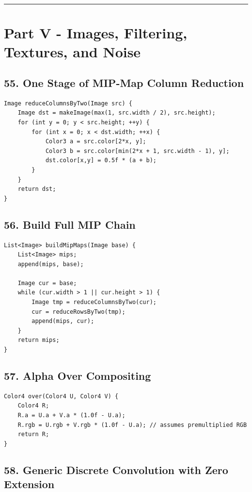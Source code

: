 \documentclass[10pt,letterpaper]{article}
\begin{document}
\medskip\hrule\medskip

\clearpage
\section{Part V - Images, Filtering, Textures, and Noise}

\subsection{55. One Stage of MIP-Map Column Reduction}

\begin{verbatim}
Image reduceColumnsByTwo(Image src) {
    Image dst = makeImage(max(1, src.width / 2), src.height);
    for (int y = 0; y < src.height; ++y) {
        for (int x = 0; x < dst.width; ++x) {
            Color3 a = src.color[2*x, y];
            Color3 b = src.color[min(2*x + 1, src.width - 1), y];
            dst.color[x,y] = 0.5f * (a + b);
        }
    }
    return dst;
}
\end{verbatim}

\subsection{56. Build Full MIP Chain}

\begin{verbatim}
List<Image> buildMipMaps(Image base) {
    List<Image> mips;
    append(mips, base);

    Image cur = base;
    while (cur.width > 1 || cur.height > 1) {
        Image tmp = reduceColumnsByTwo(cur);
        cur = reduceRowsByTwo(tmp);
        append(mips, cur);
    }
    return mips;
}
\end{verbatim}

\subsection{57. Alpha Over Compositing}

\begin{verbatim}
Color4 over(Color4 U, Color4 V) {
    Color4 R;
    R.a = U.a + V.a * (1.0f - U.a);
    R.rgb = U.rgb + V.rgb * (1.0f - U.a); // assumes premultiplied RGB
    return R;
}
\end{verbatim}

\subsection{58. Generic Discrete Convolution with Zero Extension}
\end{document}
